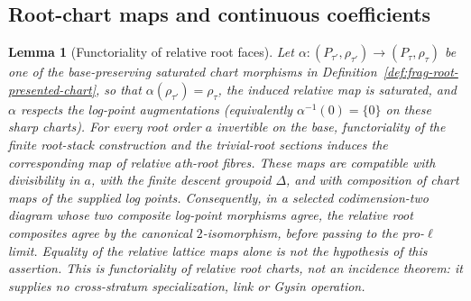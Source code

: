 \documentclass[11pt]{article}
\newtheorem{lemma}[theorem]{Lemma}
\theoremstyle{definition}
\theoremstyle{remark}
\begin{document}
\subsection{Root-chart maps and continuous coefficients}

\begin{lemma}[Functoriality of relative root faces]
\label{lem:frag-root-face-functoriality}
Let
$\alpha:(P_{\tau'},\rho_{\tau'})\to(P_\tau,\rho_\tau)$ be one of the
base-preserving saturated chart morphisms in
Definition~\ref{def:frag-root-presented-chart}, so that
$\alpha(\rho_{\tau'})=\rho_\tau$, the induced relative map is saturated,
and $\alpha$ respects the log-point augmentations (equivalently
$\alpha^{-1}(0)=\{0\}$ on these sharp charts).
For every root order $a$ invertible on the base, functoriality of the finite root-stack
construction and the trivial-root sections induces the corresponding map of
relative $a$th-root fibres.  These maps are compatible with divisibility in
$a$, with the finite descent groupoid $\Delta$, and with composition of chart
maps of the supplied log points.  Consequently, in a selected
codimension-two diagram whose two composite log-point morphisms agree,
the relative root composites agree by the canonical $2$-isomorphism,
before passing to the pro-$\ell$ limit.  Equality of the relative
lattice maps alone is not the hypothesis of this assertion.
This is functoriality of relative root charts, not an incidence theorem:
it supplies no cross-stratum specialization, link or Gysin operation.
\end{lemma}
\end{document}
